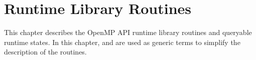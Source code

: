 %
%
%
%
%
%
%
%
%
%
%
%
%

\chapter{Runtime Library Routines}
\label{chap:Runtime Library Routines}
This chapter describes the OpenMP API runtime library routines and 
queryable runtime states. In this chapter,  and  
are used as generic terms to simplify the description of the routines.

